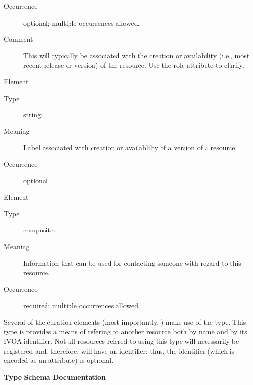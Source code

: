 \documentclass[11pt,a4paper]{ivoa}
\begin{document}
\begin{bigdescription}
\begin{description}
\item[Occurrence] optional; multiple occurrences allowed.
\item[Comment] 
               This will typically be associated with the creation or 
               availability (i.e., most recent release or version) of
               the resource.  Use the role attribute to clarify.
             

\end{description}
\item[Element \xmlel{version}]
\begin{description}
\item[Type] string: 
\item[Meaning] 
               Label associated with creation or availablilty of a version of 
               a resource.
             
\item[Occurrence] optional

\end{description}
\item[Element \xmlel{contact}]
\begin{description}
\item[Type] composite: 
\item[Meaning] 
               Information that can be used for contacting someone with
               regard to this resource.
             
\item[Occurrence] required; multiple occurrences allowed.

\end{description}


\end{bigdescription}\endgroup

\endgroup

Several of the curation elements (most importantly,
) make use of the
 type.  This type is provides a means of
refering to another resource both by name and by its IVOA
identifier.  Not all resources refered to using this type will
necessarily be registered and, therefore, will have an identifier;
thus, the identifier (which is encoded as an attribute) is optional. 


\begingroup
      	\renewcommand*\descriptionlabel[1]{%
      	\hbox to 5.5em{\emph{#1}\hfil}}\vspace{2ex}\noindent\textbf{ Type Schema Documentation}
\end{document}
